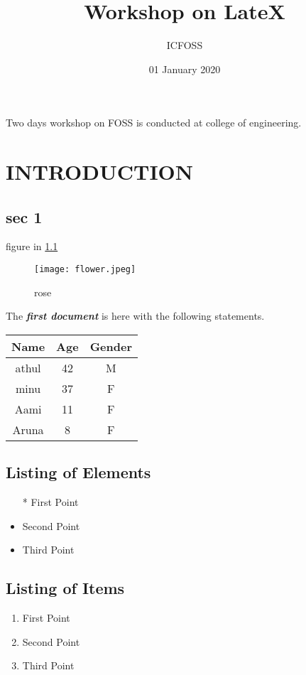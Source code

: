\documentclass[12pt]{report}
\begin{document}
\title{Workshop on LateX}
\author{ICFOSS}
\date{ 01 January 2020}
\maketitle
Two days workshop on FOSS is conducted at college of engineering.
\chapter{ INTRODUCTION}
\section{sec 1}
figure in \ref{f:l1}

\begin{figure}[H]
\centering
\texttt{[image: flower.jpeg]}
\caption{rose}
\label{f:l1}

\end{figure}

The \textit{\textbf {first document }}is here with the following statements.
\begin{center}
\begin{tabular}{|c|c|c|}
\hline
\textbf {Name} & \textbf{Age} & \textbf{Gender}  \\
\hline
athul & 42 & M \\
minu & 37 & F \\
Aami & 11 & F\\
Aruna & 8 & F \\
\hline

\end{tabular}
\end{center}

\section{Listing of Elements}
\begin{itemize}
\item[*] First Point
\item Second Point
\item Third Point
\end{itemize}


\section{Listing of Items}
\begin{enumerate}[label=\alph*]
\item First Point
\item Second Point
\item Third Point
\end{enumerate}
\end{document}
